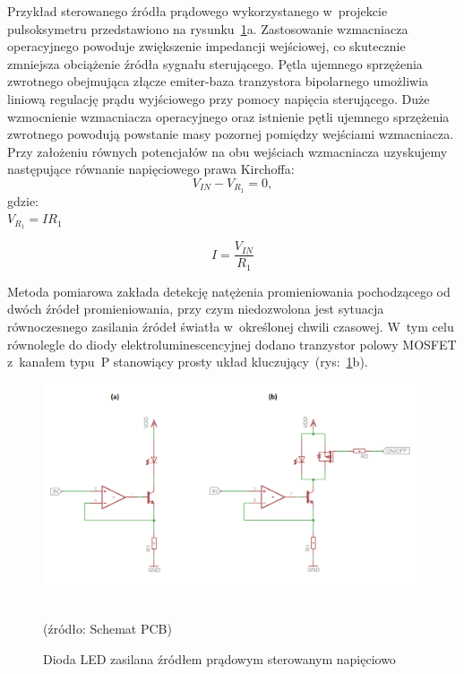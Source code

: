 Przykład sterowanego źródła prądowego wykorzystanego w~projekcie pulsoksymetru przedstawiono na rysunku~\ref{rys:Led_Control}a. Zastosowanie wzmacniacza operacyjnego powoduje zwiększenie impedancji
wejściowej, co skutecznie zmniejsza obciążenie źródła sygnału sterującego. Pętla ujemnego sprzężenia zwrotnego obejmująca złącze emiter-baza tranzystora bipolarnego umożliwia liniową regulację
prądu wyjściowego przy pomocy napięcia sterującego. Duże wzmocnienie wzmacniacza operacyjnego oraz istnienie pętli ujemnego sprzężenia zwrotnego powodują powstanie masy pozornej pomiędzy wejściami wzmacniacza. 
Przy założeniu równych potencjałów na obu wejściach wzmacniacza uzyskujemy następujące równanie napięciowego prawa Kirchoffa: 
\begin{equation}
\label{equ:Kirchoff1}
	V_{IN} - V_{R_{1}} = 0,	
\end{equation}
gdzie:\\
$V_{R_{1}} = IR_{1}$

\begin{equation}
\label{equ:Kirchoff2}
	I = \frac{V_{IN}}{R_{1}}
\end{equation}

Metoda pomiarowa zakłada detekcję natężenia promieniowania pochodzącego od dwóch źródeł promieniowania, przy czym niedozwolona jest sytuacja równoczesnego zasilania źródeł światła w~określonej chwili czasowej.
W~tym celu równolegle do diody elektroluminescencyjnej dodano tranzystor polowy MOSFET z~kanałem typu~P stanowiący prosty układ kluczujący~(rys:~\ref{rys:Led_Control}b).
\begin{figure}[ht]
	\centerline{\includegraphics[scale = 0.58]{graphic/Led_Control}}
	\caption{Dioda LED zasilana źródłem prądowym sterowanym napięciowo}
	~\\
	(źródło: Schemat PCB)
	\label{rys:Led_Control}
\end{figure}

